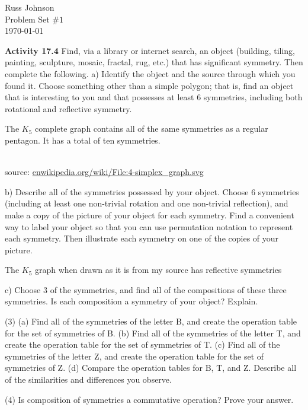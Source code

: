 \documentclass[11pt,a4paper]{article}
\begin{document}
\begin{flushright}
Russ Johnson\\
Problem Set $\#1$\\
\today\\
\end{flushright}

{\bf Activity 17.4} Find, via a library or internet search, an object (building, tiling,
painting, sculpture, mosaic, fractal, rug, etc.) that has significant symmetry. Then
complete the following.
a) Identify the object and the source through which you found it. Choose
something other than a simple polygon; that is, find an object that is interesting to you and that possesses at least 6 symmetries, including both
rotational and reflective symmetry.

The $K_5$ complete graph contains all of the same symmetries as a regular pentagon. It has a total of ten symmetries.\\
~\\
\begin{flushright}
source: \url{enwikipedia.org/wiki/File:4-simplex_graph.svg}
\end{flushright}

b) Describe all of the symmetries possessed by your object. Choose 6 symmetries (including at least one non-trivial rotation and one non-trivial reflection), and make a copy of the picture of your object for each symmetry.
Find a convenient way to label your object so that you can use permutation
notation to represent each symmetry. Then illustrate each symmetry on
one of the copies of your picture.

The $K_5$ graph when drawn as it is from my source has reflective symmetries 

c) Choose 3 of the symmetries, and find all of the compositions of these three symmetries. Is each composition a symmetry of your object? Explain.



(3) (a) Find all of the symmetries of the letter B, and create the operation table
for the set of symmetries of B.
(b) Find all of the symmetries of the letter T, and create the operation table
for the set of symmetries of T.
(c) Find all of the symmetries of the letter Z, and create the operation table
for the set of symmetries of Z.
(d) Compare the operation tables for B, T, and Z. Describe all of the similarities and differences you observe.

(4) Is composition of symmetries a commutative operation? Prove your answer.
\end{document}
